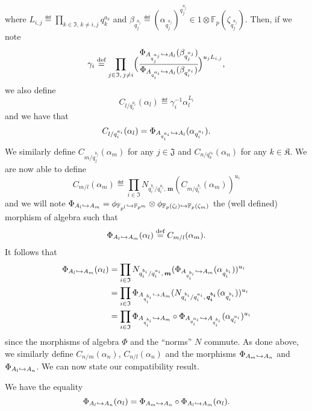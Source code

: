 \documentclass[a4paper,11pt]{article}
\begin{document}
where $L_{i, j}\eqdef\prod_{k\in\mathfrak I,\, k\neq i, j}q_k^{a_k}$ and
$\beta_{q_j^{a_j}}\eqdef
(\alpha_{q_j^{a_j}})^{q_j^{a_j}}\in1\otimes\mathbb{F}_{p}(\zeta_{q_j^{a_j}})$.
Then, if we note
\[
  \gamma_{i} \overset{\text{def}}{=} \prod_{j\in\mathfrak I,\,j\neq i}\Bigl(\cfrac{\Phi_{A_{q_j^{a_j}}\hookrightarrow
A_l}(\beta_{q_j^{a_j}})}{\Phi_{A_{q_i^{a_i}}\hookrightarrow
A_l}(\beta_{q_i^{a_i}})}\Bigr)^{u_jL_{i,j}},
\]
we also define
\[
  C_{l/q_i^{a_i}}(\alpha_l)\eqdef \gamma_i^{-1}\alpha_l^{L_i}
\]
and we have that
\[
  C_{l/q_i^{a_i}}(\alpha_l)=\Phi_{A_{q_i^{a_i}}\hookrightarrow
  A_{l}}(\alpha_{q_i^{a_i}}).
\]
We similarly define $C_{m/q_j^{b_j}}(\alpha_m)$ for any $j\in\mathfrak J$ and
$C_{n/q_k^{c_k}}(\alpha_n)$ for any $k\in\mathfrak K$. We are now able to define
\[
  C_{m/l}(\alpha_m) \eqdef\prod_{i\in\mathfrak
  I}N_{q_i^{b_i}/q_i^{a_i},\,\bm{m}}(C_{m/q_i^{b_i}}(\alpha_m))^{u_i}
\]
and we will note $\Phi_{A_l\hookrightarrow
A_m}=\phi_{\mathbb{F}_{p^l}\hookrightarrow\mathbb{F}_{p^m}}\otimes\phi_{\mathbb{F}_{p}(\zeta_l)\hookrightarrow\mathbb{F}_p(\zeta_m)}$ the (well defined) morphism of algebra
such that
\[
  \Phi_{A_l\hookrightarrow A_m}(\alpha_l) \overset{\text{def}}{=} C_{m/l}(\alpha_m).
\]
It follows that
\begin{align*}
  \Phi_{A_l\hookrightarrow A_m}(\alpha_l) &= \prod_{i\in\mathfrak
  I}N_{q_i^{b_i}/q_i^{a_i},\,\bm{m}}(\Phi_{A_{q_i^{b_i}}\hookrightarrow
A_m}(\alpha_{q_i^{b_i}}))^{u_i}\\
&= \prod_{i\in\mathfrak I}\Phi_{A_{q_i^{b_i}}\hookrightarrow
A_m}(N_{q_i^{b_i}/q_i^{a_i},\,\bm{q_i^{b_i}}}(\alpha_{q_i^{b_i}}))^{u_i}\\
&= \prod_{i\in\mathfrak I}\Phi_{A_{q_i^{b_i}}\hookrightarrow
A_m}\circ\Phi_{A_{q_i^{a_i}}\hookrightarrow A_{q_i^{b_i}}}(\alpha_{q_i^{a_i}})^{u_i}
\end{align*}
since the morphisms of algebra $\Phi$ and the ``norms'' $N$ commute. As done
above, we similarly define $C_{n/m}(\alpha_n)$, $C_{n/l}(\alpha_n)$ and the
morphisms $\Phi_{A_m\hookrightarrow A_n}$ and $\Phi_{A_l\hookrightarrow A_n}$. We can now state our
compatibility result.
\begin{prop}
We have the equality
\[
  \Phi_{A_l\hookrightarrow A_n}(\alpha_l) = \Phi_{A_m\hookrightarrow A_n}\circ\Phi_{A_l\hookrightarrow
  A_m}(\alpha_l).
\]
\end{prop}
\end{document}
